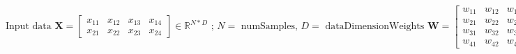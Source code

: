 \documentclass{article}
\begin{document}
\begin{subequations}
    \begin{equation}
        \text{Input data } \boldsymbol{X} = \begin{bmatrix}
                                                x_{11} & x_{12} & x_{13} & x_{14}\\
                                                x_{21} & x_{22} & x_{23} & x_{24}
                                            \end{bmatrix} \in \mathds{R}^{N*D}
        \text{ ; $N = $ numSamples, $D = $ dataDimension}
    \end{equation}
    \begin{equation}
        \text{Weights } \boldsymbol{W} = \begin{bmatrix}
                                            w_{11} & w_{12} & w_{13}\\
                                            w_{21} & w_{22} & w_{23}\\
                                            w_{31} & w_{32} & w_{33}\\
                                            w_{41} & w_{42} & w_{43}
                                         \end{bmatrix} \in \mathds{R}^{D*C}
        \text{ ; $C = $ number of classes}
    \end{equation}
    \begin{equation}
            \text{Bias vector } \boldsymbol{b} = \begin{bmatrix}
                                                    b_{1} & b_{2} & b_{3}
                                                 \end{bmatrix} \in \mathds{R}^{C}
    \end{equation}
    \begin{equation}
            \text{Bias matrix } \boldsymbol{B} = \begin{bmatrix}
                                                    b_{1} & b_{2} & b_{3}\\
                                                    b_{1} & b_{2} & b_{3}
                                                \end{bmatrix} \in \mathds{R}^{N*C}
            \text{; Bias vector is 'broadcast' once for each data sample}
    \end{equation}
    \begin{equation}
        \begin{aligned}[t]

\end{aligned}
\end{equation}
\end{subequations}
\end{document}
